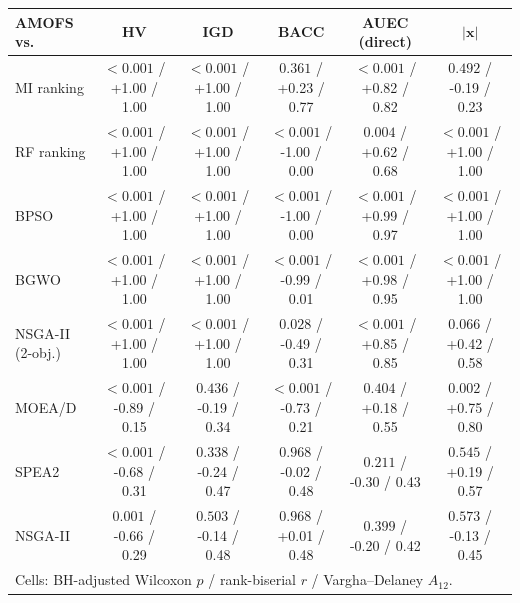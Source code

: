 \begin{tabular}{lccccc}
\toprule
AMOFS vs. & HV & IGD & BACC & AUEC (direct) & $|\mathbf{x}|$ \\
\midrule
MI ranking & $<\!0.001$ / +1.00 / 1.00 & $<\!0.001$ / +1.00 / 1.00 & $0.361$ / +0.23 / 0.77 & $<\!0.001$ / +0.82 / 0.82 & $0.492$ / -0.19 / 0.23 \\
RF ranking & $<\!0.001$ / +1.00 / 1.00 & $<\!0.001$ / +1.00 / 1.00 & $<\!0.001$ / -1.00 / 0.00 & $0.004$ / +0.62 / 0.68 & $<\!0.001$ / +1.00 / 1.00 \\
BPSO & $<\!0.001$ / +1.00 / 1.00 & $<\!0.001$ / +1.00 / 1.00 & $<\!0.001$ / -1.00 / 0.00 & $<\!0.001$ / +0.99 / 0.97 & $<\!0.001$ / +1.00 / 1.00 \\
BGWO & $<\!0.001$ / +1.00 / 1.00 & $<\!0.001$ / +1.00 / 1.00 & $<\!0.001$ / -0.99 / 0.01 & $<\!0.001$ / +0.98 / 0.95 & $<\!0.001$ / +1.00 / 1.00 \\
NSGA-II (2-obj.) & $<\!0.001$ / +1.00 / 1.00 & $<\!0.001$ / +1.00 / 1.00 & $0.028$ / -0.49 / 0.31 & $<\!0.001$ / +0.85 / 0.85 & $0.066$ / +0.42 / 0.58 \\
MOEA/D & $<\!0.001$ / -0.89 / 0.15 & $0.436$ / -0.19 / 0.34 & $<\!0.001$ / -0.73 / 0.21 & $0.404$ / +0.18 / 0.55 & $0.002$ / +0.75 / 0.80 \\
SPEA2 & $<\!0.001$ / -0.68 / 0.31 & $0.338$ / -0.24 / 0.47 & $0.968$ / -0.02 / 0.48 & $0.211$ / -0.30 / 0.43 & $0.545$ / +0.19 / 0.57 \\
NSGA-II & $0.001$ / -0.66 / 0.29 & $0.503$ / -0.14 / 0.48 & $0.968$ / +0.01 / 0.48 & $0.399$ / -0.20 / 0.42 & $0.573$ / -0.13 / 0.45 \\
\bottomrule
\multicolumn{6}{l}{\footnotesize Cells: BH-adjusted Wilcoxon $p$ / rank-biserial $r$ / Vargha--Delaney $\hat A_{12}$.} \\
\end{tabular}

